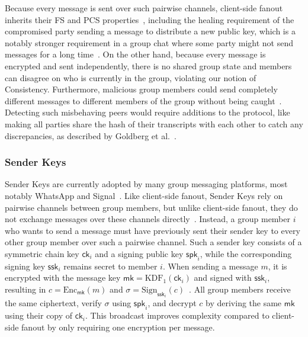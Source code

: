 \documentclass[conference]{IEEEtran}
\begin{document}
Because every message is sent over such pairwise channels, client-side fanout inherits their \ac{FS} and \ac{PCS} properties~\cite{cohn-gordonEndstoEndsEncryptionAsynchronous2018,roslerMoreLessEndtoEnd2018}, including the healing requirement of the compromised party sending a message to distribute a new public key, which is a notably stronger requirement in a group chat where some party might not send messages for a long time~\cite{weidnerKeyAgreementDecentralized2021}.
On the other hand, because every message is encrypted and sent independently, there is no shared group state and members can disagree on who is currently in the group, violating our notion of Consistency.
Furthermore, malicious group members could send completely different messages to different members of the group without being caught~\cite{goldbergMultipartyOfftherecordMessaging2009}.
Detecting such misbehaving peers would require additions to the protocol, like making all parties share the hash of their transcripts with each other to catch any discrepancies, as described by Goldberg et al.~\cite{goldbergMultipartyOfftherecordMessaging2009}.

\subsubsection{Sender Keys}\label{sec:sender-keys}
Sender Keys are currently adopted by many group messaging platforms, most notably WhatsApp and Signal~\cite{balbasWhatsUppSenderKeys2023}.
Like client-side fanout, Sender Keys rely on pairwise channels between group members, but unlike client-side fanout, they do not exchange messages over these channels directly~\cite{balbasWhatsUppSenderKeys2023}.
Instead, a group member $i$ who wants to send a message must have previously sent their sender key to every other group member over such a pairwise channel.
Such a sender key consists of a symmetric chain key $\mathsf{ck}_i$ and a signing public key $\mathsf{spk}_i$, while the corresponding signing key $\mathsf{ssk}_i$ remains secret to member $i$.
When sending a message $m$, it is encrypted with the message key $\mathsf{mk} = \mathrm{KDF}_1(\mathsf{ck}_i)$ and signed with $\mathsf{ssk}_i$, resulting in $c = \mathrm{Enc}_{\mathsf{mk}}(m)$ and $\sigma = \mathrm{Sign}_{\mathsf{ssk}_i}(c)$~\cite{balbasWhatsUppSenderKeys2023}.
All group members receive the same ciphertext, verify $\sigma$ using $\mathsf{spk}_i$, and decrypt $c$ by deriving the same $\mathsf{mk}$ using their copy of $\mathsf{ck}_i$.
This broadcast improves complexity compared to client-side fanout by only requiring one encryption per message.
\end{document}
